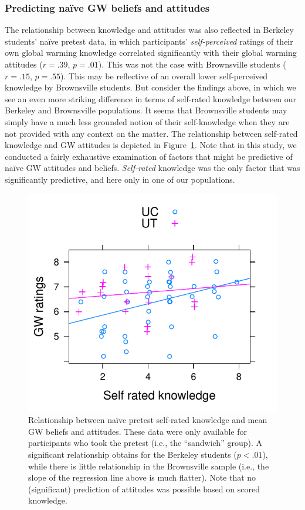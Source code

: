 \subsubsection{Predicting na\"ive GW beliefs and attitudes}

The relationship between knowledge and attitudes was also reflected in Berkeley
students’ naïve pretest data, in which participants’ \emph{self-perceived} ratings of
their own global warming knowledge correlated significantly with their global
warming attitudes ($r = .39$, $p = .01$). This was not the case with
Brownsville students ($r = .15$, $p = .55$). This may be reflective of an overall
lower self-perceived knowledge by Brownsville students. But consider the
findings above, in which we see an even more striking difference in terms of
self-rated knowledge between our Berkeley and Brownsville populations. It seems
that Brownsville students may simply have a much less grounded notion of their
self-knowledge when they are not provided with any context on the matter. The
relationship between self-rated knowledge and GW attitudes is depicted in
Figure~\ref{fig:class-predicting-gw}. Note that in this study, we conducted a
fairly exhaustive examination of factors that might be predictive of naïve GW
attitudes and beliefs. \emph{Self-rated} knowledge was the only factor that was
significantly predictive, and here only in one of our populations.

\begin{figure}
    \centering
    \includegraphics{class-predicting-gw.pdf}
    \caption{Relationship between na\"ive pretest self-rated knowledge and mean
        GW beliefs and attitudes. These data were only available for
        participants who took the pretest (i.e., the “sandwich” group). A
        significant relationship obtains for the Berkeley students ($p < .01$),
        while there is little relationship in the Brownsville sample (i.e., the
        slope of the regression line above is much flatter). Note that no
        (significant) prediction of attitudes was possible based on scored
        knowledge.}
    \label{fig:class-predicting-gw}
\end{figure}

